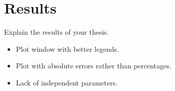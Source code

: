 \chapter{Results} \label{Chap:Results}

Explain the results of your thesis.

\begin{itemize}
    \item Plot window with better legends.
    \item Plot with absolute errors rather than percentages.
    \item Lack of independent parameters.
\end{itemize}